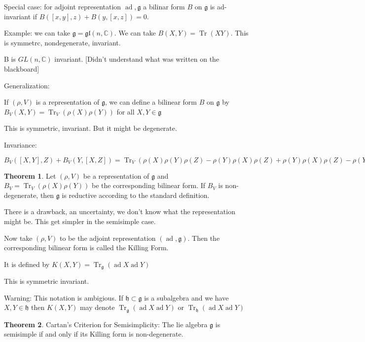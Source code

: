 \documentclass{article}
\theoremstyle{definition}
\newtheorem{theorem}{Theorem}
\newcommand{\ad}{\operatorname{ad}}
\newcommand{\Tr}{\operatorname{Tr}}
\begin{document}
Special case: for adjoint representation \(\ad,\mathfrak{g} \) a bilinar form \(B\) on \(\mathfrak{g} \) is ad-invariant if \(B([x,y],z)+B(y,[x,z])=0\).

Example: we can take \(\mathfrak{g} =\mathfrak{gl}(n,\mathbb{C} ) \). We can take \(B(X,Y)=\Tr(XY)\). This is symmetrc, nondegenerate, invariant. 

B is \(GL(n,\mathbb{C} )\) invariant. [Didn't understand what was written on the blackboard]

Generalization:

If \((\rho ,V)\) is a representation of \(\mathfrak{g} \), we can define a bilinear form \(B\) on \(\mathfrak{g} \) by \(B_V(X,Y)=\Tr_V(\rho(X)\rho (Y))\) for all \(X,Y\in \mathfrak{g} \) 

This is symmetric, invariant. But it might be degenerate.

Invariance:

\(B_V([X,Y],Z)+B_V(Y,[X,Z])=\Tr_V(\rho(X)\rho (Y)\rho (Z)-\rho (Y)\rho (X)\rho (Z)+\rho (Y)\rho (X)\rho (Z)-\rho (Y)\rho (Z)\rho (X))=0\)

\begin{theorem}
    Let \((\rho ,V)\) be a representation of \(\mathfrak{g} \) and \(B_{V} =\Tr_V(\rho (X)\rho (Y))\) be the corresponding bilinear form. If \(B_V\) is non-degenerate, then \(\mathfrak{g} \) is reductive according to the standard definition.
\end{theorem}

There is a drawback, an uncertainty, we don't know what the representation might be. This get simpler in the semisimple case.

Now take \((\rho ,V)\) to be the adjoint representation \((\ad,\mathfrak{g} )\). Then the corresponding bilinear form is called the Killing Form.

It is defined by \(K(X,Y)=\Tr_{\mathfrak{g} }(\ad X\ad Y)\) 

This is symmetric invariant.

Warning: This notation is ambigious. If \(\mathfrak{h}\subset \mathfrak{g} \) is a subalgebra and we have \(X,Y\in \mathfrak{h} \) then \(K(X,Y)\) may denote \(\Tr_{\mathfrak{g} }(\ad X\ad Y)\) or \(\Tr_{\mathfrak{h}}(\ad X\ad Y) \)

\begin{theorem}
    Cartan's Criterion for Semisimplicity: The lie algebra \(\mathfrak{g} \) is semisimple if and only if its Killing form is non-degenerate.
\end{theorem}
\end{document}
